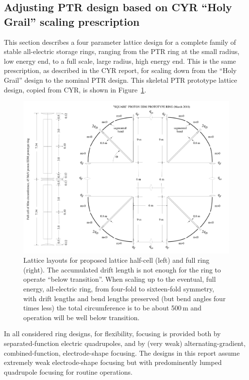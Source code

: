 \documentclass[]{article}
\begin{document}
\subsection{Adjusting PTR design based on CYR ``Holy Grail'' scaling prescription}
This section describes a four parameter lattice design for a complete family of 
stable all-electric storage rings, ranging from the PTR ring at the small radius, 
low energy end, to a full scale, large radius, high energy end. This is the
same prescription, as described in the CYR report, for scaling down from the
``Holy Grail'' design to the nominal  PTR design.
This skeletal PTR prototype lattice design, copied from CYR, 
is shown in Figure~\ref{fig:pEDM-square-proto}. 
\medskip
%
\begin{figure}[hbp]
\centering
\includegraphics[scale=0.25]{pdf/pEDM-square-proto-w-fullcell.pdf}
\caption{\label{fig:pEDM-square-proto} Lattice layouts for proposed lattice 
half-cell (left) and full 
ring (right). The accumulated drift length is not enough for the ring
to operate ``below transition''.  When scaling up to the eventual, full 
energy, all-electric ring, from four-fold to sixteen-fold symmetry, with
drift lengths and bend lengths preserved (but bend angles four times less)
the total circumference is to be about 500\,m and operation will be well
below transition.} 
\end{figure}
%
In all considered ring designs, for flexibility, focusing is provided both
by separated-function electric quadrupoles, and by (very weak) 
alternating-gradient, combined-function, electrode-shape focusing.
The designs in this report assume extremely weak electrode-shape 
focusing but with predominently lumped quadrupole focusing for routine 
operations. 
\end{document}
